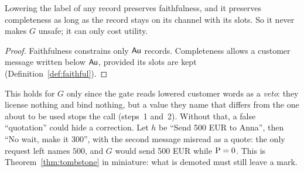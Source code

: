\begin{proposition}\label{prop:lower}
Lowering the label of any record preserves faithfulness, and it preserves completeness as long as
the record stays on its channel with its slots. So it never makes $G$ unsafe; it can only cost
utility.
\end{proposition}
\begin{proof}
Faithfulness constrains only $\mathsf{Au}$ records. Completeness allows a customer message written below
$\mathsf{Au}$, provided its slots are kept (Definition~\ref{def:faithful}).
\end{proof}

\begin{remark}
This holds for $G$ only since the gate reads lowered customer words as a \emph{veto}: they license
nothing and bind nothing, but a value they name that differs from the one about to be used stops
the call (steps~1 and~2). Without that, a false ``quotation'' could hide a correction. Let $h$ be ``Send 500 EUR to Anna'', then ``No wait, make it 300'', with the second message
misread as a quote: the only request left names $500$, and $G$ would send 500 EUR while
$\mathrm{P} = 0$. This is Theorem~\ref{thm:tombstone} in miniature: what is demoted must still leave a
mark.
\end{remark}
